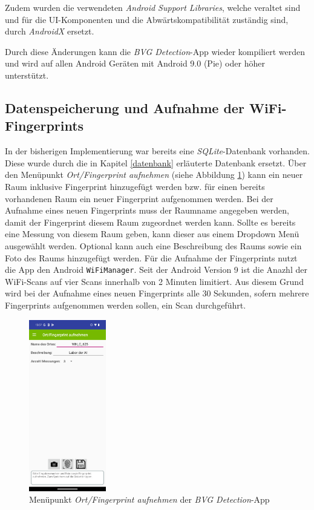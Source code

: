 Zudem wurden die verwendeten \textit{Android Support Libraries}, welche veraltet sind und für die UI-Komponenten und die Abwärtskompatibilität zuständig sind, durch \textit{AndroidX} ersetzt. %

Durch diese Änderungen kann die \textit{BVG Detection}-App wieder kompiliert werden und wird auf allen Android Geräten mit Android 9.0 (Pie) oder höher unterstützt.

\subsection{Datenspeicherung und Aufnahme der WiFi-Fingerprints}

In der bisherigen Implementierung war bereits eine \textit{SQLite}-Datenbank vorhanden. Diese wurde durch die in Kapitel \ref{datenbank} erläuterte Datenbank ersetzt. Über den Menüpunkt \textit{Ort/Fingerprint aufnehmen} (siehe Abbildung \ref{fig:bvg_detection_capture}) kann ein neuer Raum inklusive Fingerprint hinzugefügt werden bzw. für einen bereits vorhandenen Raum ein neuer Fingerprint aufgenommen werden. Bei der Aufnahme eines neuen Fingerprints muss der Raumname angegeben werden, damit der Fingerprint diesem Raum zugeordnet werden kann. Sollte es bereits eine Messung von diesem Raum geben, kann dieser aus einem Dropdown Menü ausgewählt werden. Optional kann auch eine Beschreibung des Raums sowie ein Foto des Raums hinzugefügt werden. Für die Aufnahme der Fingerprints nutzt die App den Android \texttt{WiFiManager}. Seit der Android Version 9 ist die Anazhl der WiFi-Scans auf vier Scans innerhalb von 2 Minuten limitiert. Aus diesem Grund wird bei der Aufnahme eines neuen Fingerprints alle 30 Sekunden, sofern mehrere Fingerprints aufgenommen werden sollen, ein Scan durchgeführt.

\begin{figure}[h]
    \centering
    \includegraphics[width=0.3\textwidth]{images/screenshots/capture.png}
    \caption{Menüpunkt \textit{Ort/Fingerprint aufnehmen} der \textit{BVG Detection}-App}
    \label{fig:bvg_detection_capture}
\end{figure}


